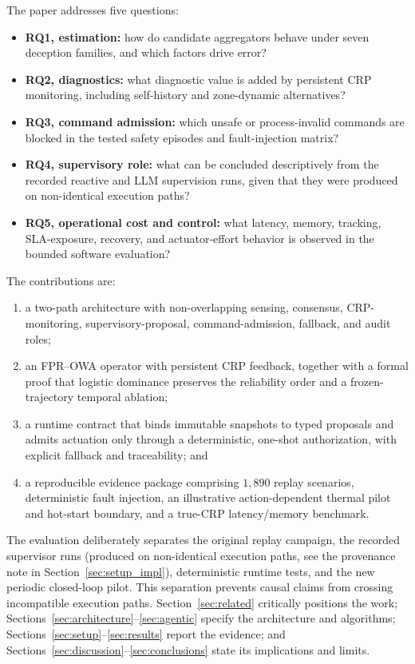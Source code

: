 \documentclass[smartcities,article,submit,moreauthors]{Definitions/mdpi}
\begin{document}
The paper addresses five questions:
\begin{itemize}
\item \textbf{RQ1, estimation:} how do candidate aggregators behave under seven deception families, and which factors drive error?
\item \textbf{RQ2, diagnostics:} what diagnostic value is added by persistent CRP monitoring, including self-history and zone-dynamic alternatives?
\item \textbf{RQ3, command admission:} which unsafe or process-invalid commands are blocked in the tested safety episodes and fault-injection matrix?
\item \textbf{RQ4, supervisory role:} what can be concluded descriptively from the recorded reactive and LLM supervision runs, given that they were produced on non-identical execution paths?
\item \textbf{RQ5, operational cost and control:} what latency, memory, tracking, SLA-exposure, recovery, and actuator-effort behavior is observed in the bounded software evaluation?
\end{itemize}

The contributions are:
\begin{enumerate}
\item a two-path architecture with non-overlapping sensing, consensus, CRP-monitoring, supervisory-proposal, command-admission, fallback, and audit roles;
\item an FPR--OWA operator with persistent CRP feedback, together with a formal proof that logistic dominance preserves the reliability order and a frozen-trajectory temporal ablation;
\item a runtime contract that binds immutable snapshots to typed proposals and admits actuation only through a deterministic, one-shot authorization, with explicit fallback and traceability; and
\item a reproducible evidence package comprising $1{,}890$ replay scenarios, deterministic fault injection, an illustrative action-dependent thermal pilot and hot-start boundary, and a true-CRP latency/memory benchmark.
\end{enumerate}

The evaluation deliberately separates the original replay campaign, the recorded supervisor runs (produced on non-identical execution paths, see the provenance note in Section~\ref{sec:setup_impl}), deterministic runtime tests, and the new periodic closed-loop pilot. This separation prevents causal claims from crossing incompatible execution paths. Section~\ref{sec:related} critically positions the work; Sections~\ref{sec:architecture}--\ref{sec:agentic} specify the architecture and algorithms; Sections~\ref{sec:setup}--\ref{sec:results} report the evidence; and Sections~\ref{sec:discussion}--\ref{sec:conclusions} state its implications and limits.
\end{document}

